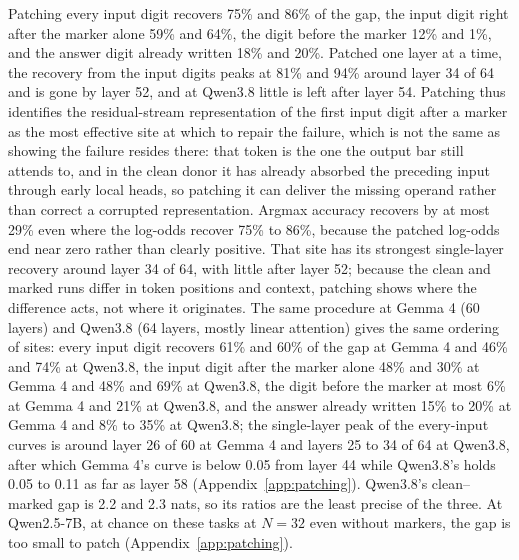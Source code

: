 \documentclass[10pt]{article} %
\begin{document}
Patching every input digit recovers 75\% and 86\% of the gap, the input digit right after the marker alone 59\% and 64\%, the digit before the marker 12\% and 1\%, and the answer digit already written 18\% and 20\%. Patched one layer at a time, the recovery from the input digits peaks at 81\% and 94\% around layer 34 of 64 and is gone by layer 52, and at Qwen3.8 little is left after layer 54. Patching thus identifies the residual-stream representation of the first input digit after a marker as the most effective site at which to repair the failure, which is not the same as showing the failure resides there: that token is the one the output bar still attends to, and in the clean donor it has already absorbed the preceding input through early local heads, so patching it can deliver the missing operand rather than correct a corrupted representation. Argmax accuracy recovers by at most 29\% even where the log-odds recover 75\% to 86\%, because the patched log-odds end near zero rather than clearly positive. That site has its strongest single-layer recovery around layer 34 of 64, with little after layer 52; because the clean and marked runs differ in token positions and context, patching shows where the difference acts, not where it originates. The same procedure at Gemma 4 (60 layers) and Qwen3.8 (64 layers, mostly linear attention) gives the same ordering of sites: every input digit recovers 61\% and 60\% of the gap at Gemma 4 and 46\% and 74\% at Qwen3.8, the input digit after the marker alone 48\% and 30\% at Gemma 4 and 48\% and 69\% at Qwen3.8, the digit before the marker at most 6\% at Gemma 4 and 21\% at Qwen3.8, and the answer already written 15\% to 20\% at Gemma 4 and 8\% to 35\% at Qwen3.8; the single-layer peak of the every-input curves is around layer 26 of 60 at Gemma 4 and layers 25 to 34 of 64 at Qwen3.8, after which Gemma 4's curve is below 0.05 from layer 44 while Qwen3.8's holds 0.05 to 0.11 as far as layer 58 (Appendix~\ref{app:patching}). Qwen3.8's clean--marked gap is 2.2 and 2.3 nats, so its ratios are the least precise of the three. At Qwen2.5-7B, at chance on these tasks at $N = 32$ even without markers, the gap is too small to patch (Appendix~\ref{app:patching}).
\end{document}
